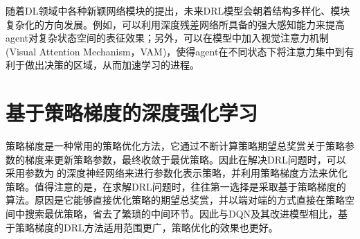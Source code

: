 \documentclass[bachelor]{thesis-uestc}
\begin{document}
	随着DL领域中各种新颖网络模块的提出，未来DRL模型会朝着结构多样化、模块复杂化的方向发展。例如，可以利用深度残差网络所具备的强大感知能力来提高agent对复杂状态空间的表征效果；另外，可以在模型中加入视觉注意力机制(Visual Attention Mechanism，VAM)，使得agent在不同状态下将注意力集中到有利于做出决策的区域，从而加速学习的进程。
	
	\section{基于策略梯度的深度强化学习}
	策略梯度是一种常用的策略优化方法，它通过不断计算策略期望总奖赏关于策略参数的梯度来更新策略参数，最终收敛于最优策略。因此在解决DRL问题时，可以采用参数为的深度神经网络来进行参数化表示策略，并利用策略梯度方法来优化策略。值得注意的是，在求解DRL问题时，往往第一选择是采取基于策略梯度的算法。原因是它能够直接优化策略的期望总奖赏，并以端对端的方式直接在策略空间中搜索最优策略，省去了繁琐的中间环节。因此与DQN及其改进模型相比，基于策略梯度的DRL方法适用范围更广，策略优化的效果也更好。
\end{document}
